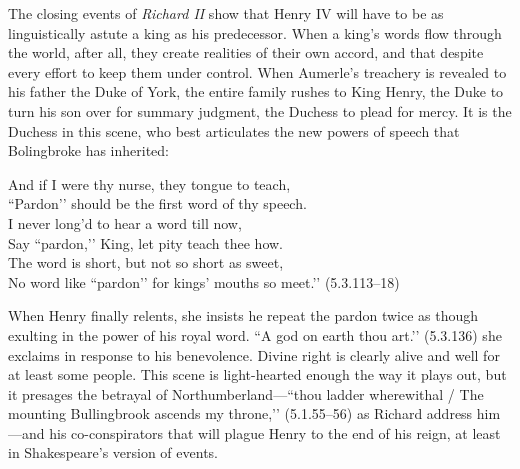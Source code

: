 The closing events of \emph{Richard II} show that Henry IV will have to be as linguistically astute a king as his predecessor.
When a king’s words flow through the world, after all, they create realities of their own accord, and that despite every effort to keep them under control.
When Aumerle’s treachery is revealed to his father the Duke of York, the entire family rushes to King Henry, the Duke to turn his son over for summary judgment, the Duchess to plead for mercy.
It is the Duchess in this scene, who best articulates the new powers of speech that Bolingbroke has inherited:
\begin{vq}
And if I were thy nurse, they tongue to teach, \\
``Pardon’’ should be the first word of thy speech. \\
I never long’d to hear a word till now, \\
Say ``pardon,’’ King, let pity teach thee how. \\
The word is short, but not so short as sweet, \\
No word like ``pardon’’ for kings’ mouths so meet.’’ (5.3.113--18)
\end{vq}
When Henry finally relents, she insists he repeat the pardon twice as though exulting in the power of his royal word.
``A god on earth thou art.’’ (5.3.136) she exclaims in response to his benevolence.
Divine right is clearly alive and well for at least some people.
This scene is light-hearted enough the way it plays out, but it presages the betrayal of Northumberland---``thou ladder wherewithal / The mounting Bullingbrook ascends my throne,’’ (5.1.55--56) as Richard address him---and his co-conspirators that will plague Henry to the end of his reign, at least in Shakespeare’s version of events.


